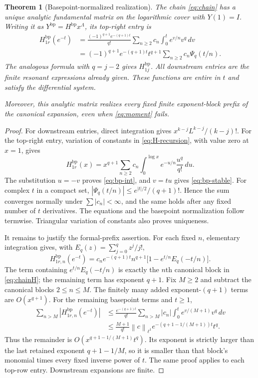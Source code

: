 \documentclass[11pt,a4paper]{article}
\numberwithin{equation}{section}
\newtheorem{theorem}{Theorem}[section]
\theoremstyle{definition}
\theoremstyle{remark}
\newcommand{\norm}[1]{\left\|#1\right\|}
\begin{document}
\begin{theorem}[Basepoint-normalized realization]\label{thm:analytic-chain}
The chain \eqref{eq:chain} has a unique analytic fundamental matrix on the
logarithmic cover with $Y(1)=I$. Writing it as
$Y^{\mathrm{bp}}=H^{\mathrm{bp}}x^\Lambda$, its top-right entry is
\begin{align}
 H^{\mathrm{bp}}_{1r}(e^{-t})
 &=\frac{(-1)^{q+1}e^{-(q+1)t}}{q!}
      \sum_{n\geq2}c_n\int_0^t e^{v/n}v^q\,dv\label{eq:bp-int}\\
 &=(-1)^{q+1}e^{-(q+1)t}t^{q+1}
      \sum_{n\geq2}c_n\Psi_q(t/n).\label{eq:bp-stable}
\end{align}
The analogous formula with $q=j-2$ gives $H^{\mathrm{bp}}_{1j}$.
All downstream entries are the finite resonant expressions already given.
These functions are entire in $t$ and satisfy the differential system.

Moreover, this analytic matrix realizes every fixed finite exponent-block
prefix of the canonical expansion, even when \eqref{eq:moment} fails.
\end{theorem}

\begin{proof}
For downstream entries, direct integration gives
$x^{k-j}L^{k-j}/(k-j)!$. For the top-right entry, variation of constants
in \eqref{eq:H-recursion}, with value zero at $x=1$, gives
\[
 H^{\mathrm{bp}}_{1r}(x)
 =x^{q+1}\sum_{n\geq2}c_n\int_0^{\log x}
                      e^{-u/n}\frac{u^q}{q!}\,du.
\]
The substitution $u=-v$ proves \eqref{eq:bp-int}, and $v=tu$ gives
\eqref{eq:bp-stable}. For complex $t$ in a compact set,
$|\Psi_q(t/n)|\leq e^{|t|/2}/(q+1)!$. Hence the sum converges normally
under $\sum|c_n|<\infty$, and the same holds after any fixed number of
$t$ derivatives. The equations and the basepoint normalization follow
termwise. Triangular variation of constants also proves uniqueness.

It remains to justify the formal-prefix assertion. For each fixed $n$,
elementary integration gives, with $E_q(z)=\sum_{j=0}^qz^j/j!$,
\begin{equation}\label{eq:subtraction}
 H^{\mathrm{bp}}_{1r,n}(e^{-t})
 =c_ne^{-(q+1)t}n^{q+1}
       \bigl[1-e^{t/n}E_q(-t/n)\bigr].
\end{equation}
The term containing $e^{t/n}E_q(-t/n)$ is exactly the $n$th canonical
block in \eqref{eq:chainH}; the remaining term has exponent $q+1$.
Fix $M\geq2$ and subtract the canonical blocks $2\leq n\leq M$.
The finitely many added exponent-$(q+1)$ terms are $O(x^{q+1})$.
For the remaining basepoint terms and $t\geq1$,
\begin{align*}
 \sum_{n>M}|H^{\mathrm{bp}}_{1r,n}(e^{-t})|
 &\leq \frac{e^{-(q+1)t}}{q!}
     \sum_{n>M}|c_n|\int_0^t e^{v/(M+1)}v^q\,dv\\
 &\leq \frac{M+1}{q!}\norm{c}_{\ell^1}
          e^{-(q+1-1/(M+1))t}t^q.
\end{align*}
Thus the remainder is
$O(x^{q+1-1/(M+1)}t^q)$. Its exponent is strictly larger than the last
retained exponent $q+1-1/M$, so it is smaller than that block's monomial
times every fixed inverse power of $t$. The same proof applies to each
top-row entry. Downstream expansions are finite.
\end{proof}
\end{document}
